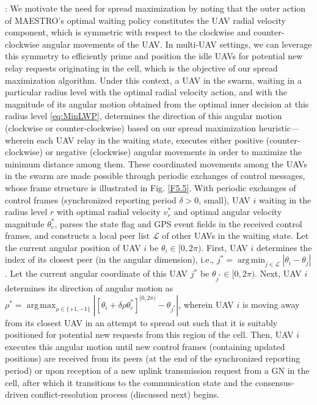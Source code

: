 \documentclass[10pt, twocolumn]{IEEEtran}
\theoremstyle{plain}
\theoremstyle{definition}
\theoremstyle{remark}
\DeclareMathOperator*{\argmax}{arg\,max}
\DeclareMathOperator*{\argmin}{arg\,min}
\begin{document}
: We motivate the need for spread maximization by noting that the outer action of MAESTRO's optimal waiting policy constitutes the UAV radial velocity component, which is symmetric with respect to the clockwise and counter-clockwise angular movements of the UAV. In multi-UAV settings, we can leverage this symmetry to efficiently prime and position the idle UAVs for potential new relay requests originating in the cell, which is the objective of our spread maximization algorithm. Under this context, a UAV in the swarm, waiting in a particular radius level with the optimal radial velocity action, and with the magnitude of its angular motion obtained from the optimal inner decision at this radius level \eqref{eq:MinLWP}, determines the direction of this angular motion (clockwise or counter-clockwise) based on our spread maximization heuristic---wherein each UAV relay in the {waiting} state, executes either positive (counter-clockwise) or negative (clockwise) angular movements in order to maximize the minimum distance among them. These coordinated movements among the UAVs in the swarm are made possible through periodic exchanges of control messages, whose frame structure is illustrated in Fig. \ref{F5.5}. With periodic exchanges of control frames (synchronized reporting period $\delta{>}0$, small), UAV $i$ waiting in the radius level $r$ with optimal radial velocity $v_{r}^{*}$ and optimal angular velocity magnitude $\theta_{c}^{*}$, parses the state flag and GPS event fields in the received control frames, and constructs a local peer list $\mathcal{L}$ of other UAVs in the waiting state. Let the current angular position of UAV $i$ be $\theta_{i}{\in}[0, 2\pi)$. First, UAV $i$ determines the index of its closest peer (in the angular dimension), i.e., $j^{*}{=}\argmin_{j{\in}\mathcal{L}}|\theta_{i}{-}\theta_{j}|$. Let the current angular coordinate of this UAV $j^{*}$ be $\theta_{j^{*}}{\in}[0,2\pi)$. Next, UAV $i$ determines its direction of angular motion as $\rho^{*}{=}\argmax_{\rho{\in}\{{+}1,{-}1\}} \left|[\theta_{i}{+}\delta\rho\theta_{c}^{*}]^{[0,2\pi)}{-}\theta_{j^{*}}\right|$, wherein UAV $i$ is moving away from its closest UAV in an attempt to spread out such that it is suitably positioned for potential new requests from this region of the cell. Then, UAV $i$ executes this angular motion until new control frames (containing updated positions) are received from its peers (at the end of the synchronized reporting period) or upon reception of a new uplink transmission request from a GN in the cell, after which it transitions to the communication state and the consensus-driven conflict-resolution process (discussed next) begins.\\
\end{document}
